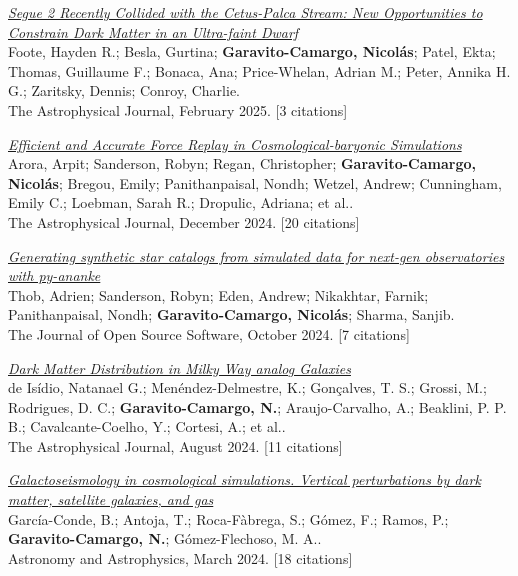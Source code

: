 \documentclass[14pt]{article}
\begin{document}
\begin{etaremune}
\item \textit{\href{https://ui.adsabs.harvard.edu/abs/2025ApJ...979..171F/abstract}{Segue 2 Recently Collided with the Cetus-Palca Stream: New Opportunities to Constrain Dark Matter in an Ultra-faint Dwarf}}\\
  {\small \color{darkgray} Foote, Hayden R.; Besla, Gurtina; \textbf{Garavito-Camargo, Nicolás}; Patel, Ekta; Thomas, Guillaume F.; Bonaca, Ana; Price-Whelan, Adrian M.; Peter, Annika H. G.; Zaritsky, Dennis; Conroy, Charlie.\\
  The Astrophysical Journal, February 2025. [3 citations]}

\item \textit{\href{https://ui.adsabs.harvard.edu/abs/2024ApJ...977...23A/abstract}{Efficient and Accurate Force Replay in Cosmological-baryonic Simulations}}\\
  {\small \color{darkgray} Arora, Arpit; Sanderson, Robyn; Regan, Christopher; \textbf{Garavito-Camargo, Nicolás}; Bregou, Emily; Panithanpaisal, Nondh; Wetzel, Andrew; Cunningham, Emily C.; Loebman, Sarah R.; Dropulic, Adriana; et al..\\
  The Astrophysical Journal, December 2024. [20 citations]}

\item \textit{\href{https://ui.adsabs.harvard.edu/abs/2024JOSS....9.6234T/abstract}{Generating synthetic star catalogs from simulated data for next-gen observatories with py-ananke}}\\
  {\small \color{darkgray} Thob, Adrien; Sanderson, Robyn; Eden, Andrew; Nikakhtar, Farnik; Panithanpaisal, Nondh; \textbf{Garavito-Camargo, Nicolás}; Sharma, Sanjib.\\
  The Journal of Open Source Software, October 2024. [7 citations]}

\item \textit{\href{https://ui.adsabs.harvard.edu/abs/2024ApJ...971...69D/abstract}{Dark Matter Distribution in Milky Way analog Galaxies}}\\
  {\small \color{darkgray} de Isídio, Natanael G.; Menéndez-Delmestre, K.; Gonçalves, T. S.; Grossi, M.; Rodrigues, D. C.; \textbf{Garavito-Camargo, N.}; Araujo-Carvalho, A.; Beaklini, P. P. B.; Cavalcante-Coelho, Y.; Cortesi, A.; et al..\\
  The Astrophysical Journal, August 2024. [11 citations]}

\item \textit{\href{https://ui.adsabs.harvard.edu/abs/2024A&A...683A..47G/abstract}{Galactoseismology in cosmological simulations. Vertical perturbations by dark matter, satellite galaxies, and gas}}\\
  {\small \color{darkgray} García-Conde, B.; Antoja, T.; Roca-Fàbrega, S.; Gómez, F.; Ramos, P.; \textbf{Garavito-Camargo, N.}; Gómez-Flechoso, M. A..\\
  Astronomy and Astrophysics, March 2024. [18 citations]}


\end{etaremune}
\end{document}

